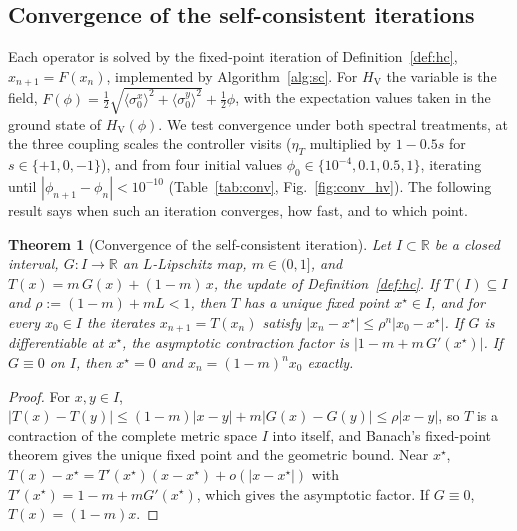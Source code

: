 \documentclass[conference]{IEEEtran}
\newtheorem{theorem}{Theorem}
\newcommand{\HV}{H_{\mathrm{V}}}
\begin{document}
\subsection{Convergence of the self-consistent iterations}\label{sec:conv}
Each operator is solved by the fixed-point iteration of Definition~\ref{def:hc}, $x_{n+1}=F(x_n)$, implemented by Algorithm~\ref{alg:sc}. For $\HV$ the variable is the field, $F(\phi)=\tfrac12\sqrt{\langle\sigma^x_0\rangle^2+\langle\sigma^y_0\rangle^2}+\tfrac12\phi$, with the expectation values taken in the ground state of $\HV(\phi)$. We test convergence under both spectral treatments, at the three coupling scales the controller visits ($\eta_T$ multiplied by $1-0.5s$ for $s\in\{+1,0,-1\}$), and from four initial values $\phi_0\in\{10^{-4},0.1,0.5,1\}$, iterating until $|\phi_{n+1}-\phi_n|<10^{-10}$ (Table~\ref{tab:conv}, Fig.~\ref{fig:conv_hv}). The following result says when such an iteration converges, how fast, and to which point.

\begin{theorem}[Convergence of the self-consistent iteration]\label{thm:sc}
Let $I\subset\mathbb R$ be a closed interval, $G:I\to\mathbb R$ an $L$-Lipschitz map, $m\in(0,1]$, and $T(x)=m\,G(x)+(1-m)\,x$, the update of Definition~\ref{def:hc}. If $T(I)\subseteq I$ and $\rho:=(1-m)+mL<1$, then $T$ has a unique fixed point $x^\star\in I$, and for every $x_0\in I$ the iterates $x_{n+1}=T(x_n)$ satisfy $|x_n-x^\star|\le\rho^n|x_0-x^\star|$. If $G$ is differentiable at $x^\star$, the asymptotic contraction factor is $|1-m+m\,G'(x^\star)|$. If $G\equiv0$ on $I$, then $x^\star=0$ and $x_n=(1-m)^nx_0$ exactly.
\end{theorem}

\begin{proof}
For $x,y\in I$, $|T(x)-T(y)|\le(1-m)|x-y|+m|G(x)-G(y)|\le\rho|x-y|$, so $T$ is a contraction of the complete metric space $I$ into itself, and Banach's fixed-point theorem gives the unique fixed point and the geometric bound. Near $x^\star$, $T(x)-x^\star=T'(x^\star)(x-x^\star)+o(|x-x^\star|)$ with $T'(x^\star)=1-m+mG'(x^\star)$, which gives the asymptotic factor. If $G\equiv0$, $T(x)=(1-m)x$.
\end{proof}
\end{document}
